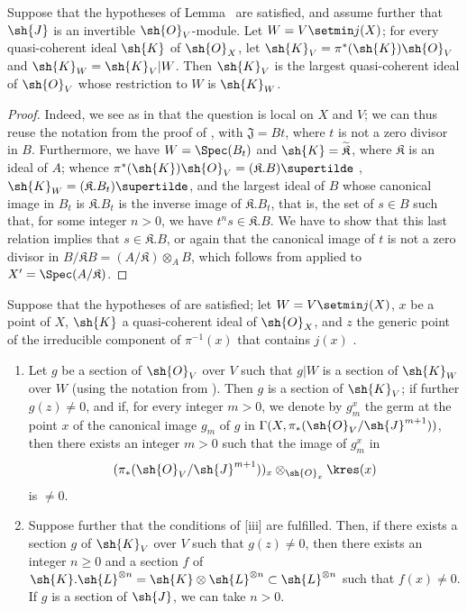 \begin{corollary}[8.10.4]
\label{II.8.10.4}
Suppose that the hypotheses of Lemma~ are satisfied, and assume further that $\sh{J}$ is an invertible $\sh{O}_V$-module.
Let $W=V\setmin j(X)$;
for every quasi-coherent ideal $\sh{K}$ of $\sh{O}_X$, let $\sh{K}_V=\pi^*(\sh{K})\sh{O}_V$ and $\sh{K}_W=\sh{K}_V|W$.
Then $\sh{K}_V$ is the largest quasi-coherent ideal of $\sh{O}_V$ whose restriction to $W$ is $\sh{K}_W$.
\end{corollary}

\begin{proof}
Indeed, we see as in  that the question is local on $X$ and $V$;
we can thus reuse the notation from the proof of , with $\mathfrak{J}=Bt$, where $t$ is not a zero divisor in $B$.
Furthermore, we have $W=\Spec(B_t)$ and $\sh{K}=\widetilde{\mathfrak{K}}$, where $\mathfrak{K}$ is an ideal of $A$;
whence $\pi^*(\sh{K})\sh{O}_V=(\mathfrak{K}.B)\supertilde$ , $\sh{K}_W=(\mathfrak{K}.B_t)\supertilde$, and the largest ideal
of $B$ whose canonical image in $B_t$ is $\mathfrak{K}.B_t$ is the inverse image of $\mathfrak{K}.B_t$, that is, the set of $s\in B$ such that, for some integer $n>0$, we have $t^ns\in\mathfrak{K}.B$.
We have to show that this last relation implies that $s\in\mathfrak{K}.B$, or again that the canonical image of $t$ is not a zero divisor in $B/\mathfrak{K}B=(A/\mathfrak{K})\otimes_AB$, which follows from  applied to $X'=\Spec(A/\mathfrak{K})$.
\end{proof}

\begin{corollary}[8.10.5]
\label{II.8.10.5}
Suppose that the hypotheses of  are satisfied;
let $W=V\setmin j(X)$, $x$ be a point of $X$, $\sh{K}$ a quasi-coherent ideal of $\sh{O}_X$, and $z$ the generic point of the irreducible component of $\pi^{-1}(x)$ that contains $j(x)$ .
\begin{enumerate}
    \item[\rm{(i)}] Let $g$ be a section of $\sh{O}_V$ over $V$ such that $g|W$ is a section of $\sh{K}_W$ over $W$ (using the notation from ).
        Then $g$ is a section of $\sh{K}_V$;
        if further $g(z)\neq0$, and if, for every integer $m>0$, we denote by $g_m^x$ the germ at the point $x$ of the canonical image $g_m$ of $g$ in $\Gamma(X,\pi_*(\sh{O}_V/\sh{J}^{m+1}))$, then there exists an integer $m>0$ such that the image of $g_m^x$ in
        \[
            (\pi_*(\sh{O}_V/\sh{J}^{m+1}))_x \otimes_{\sh{O}_x} \kres(x)
        \]
        is $\neq0$.
    \item[\rm{(ii)}] Suppose further that the conditions of [iii] are fulfilled.
        Then, if there exists a section $g$ of $\sh{K}_V$ over $V$ such that $g(z)\neq0$, then there exists an integer $n\geq0$ and a section $f$ of $\sh{K}.\sh{L}^{\otimes n}=\sh{K}\otimes\sh{L}^{\otimes n}\subset\sh{L}^{\otimes n}$ such that $f(x)\neq0$.
        If $g$ is a section of $\sh{J}$, we can take $n>0$.
\end{enumerate}
\end{corollary}

